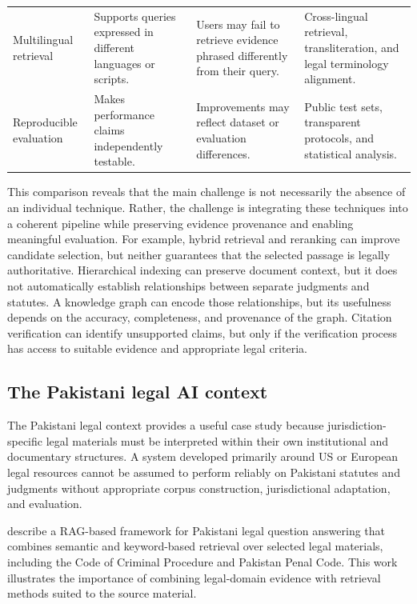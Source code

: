 \begin{table}[tp]
\begin{tabularx}{\textwidth}{>{\raggedright\arraybackslash}p{3.0cm} >{\raggedright\arraybackslash}X >{\raggedright\arraybackslash}X >{\raggedright\arraybackslash}X}
Multilingual retrieval & Supports queries expressed in different languages or scripts. & Users may fail to retrieve evidence phrased differently from their query. & Cross-lingual retrieval, transliteration, and legal terminology alignment. \\
Reproducible evaluation & Makes performance claims independently testable. & Improvements may reflect dataset or evaluation differences. & Public test sets, transparent protocols, and statistical analysis. \\
\bottomrule
\end{tabularx}
\end{table}

This comparison reveals that the main challenge is not necessarily the absence of an individual
technique. Rather, the challenge is integrating these techniques into a coherent pipeline while
preserving evidence provenance and enabling meaningful evaluation. For example, hybrid retrieval and
reranking can improve candidate selection, but neither guarantees that the selected passage is legally
authoritative. Hierarchical indexing can preserve document context, but it does not automatically
establish relationships between separate judgments and statutes. A knowledge graph can encode those
relationships, but its usefulness depends on the accuracy, completeness, and provenance of the graph.
Citation verification can identify unsupported claims, but only if the verification process has access
to suitable evidence and appropriate legal criteria.

\subsection{The Pakistani legal AI context}

The Pakistani legal context provides a useful case study because jurisdiction-specific legal materials
must be interpreted within their own institutional and documentary structures. A system developed
primarily around US or European legal resources cannot be assumed to perform reliably on Pakistani
statutes and judgments without appropriate corpus construction, jurisdictional adaptation, and
evaluation.

\citet{ref312025} describe a RAG-based framework for Pakistani legal question answering that combines
semantic and keyword-based retrieval over selected legal materials, including the Code of Criminal
Procedure and Pakistan Penal Code. This work illustrates the importance of combining legal-domain
evidence with retrieval methods suited to the source material.

